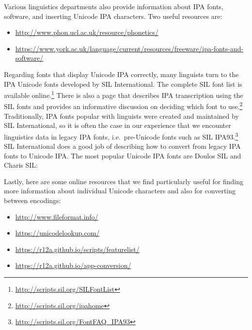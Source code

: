 \noindent Various linguistics departments also provide information about IPA fonts, software, and inserting Unicode IPA characters. Two useful resources are:

\begin{itemize}
	\item \url{http://www.phon.ucl.ac.uk/resource/phonetics/}
	\item \url{https://www.york.ac.uk/language/current/resources/freeware/ipa-fonts-and-software/}
\end{itemize}	

Regarding fonts that display Unicode IPA correctly, many linguists turn to the IPA Unicode fonts developed by SIL International. The complete SIL font list is available online.\footnote{\url{http://scripts.sil.org/SILFontList}} There is also a page that describes IPA transcription using the SIL fonts and provides an informative discussion on deciding which font to use.\footnote{\url{http://scripts.sil.org/ipahome}} Traditionally, IPA fonts popular with linguists were created and maintained by SIL International, so it is often the case in our experience that we encounter linguistics data in legacy IPA fonts, i.e.\ pre-Unicode fonts such as SIL IPA93.\footnote{\url{http://scripts.sil.org/FontFAQ_IPA93}} SIL International does a good job of describing how to convert from legacy IPA fonts to Unicode IPA. The most popular Unicode IPA fonts are Doulos SIL and Charis SIL:

\begin{itemize}
	\item \url{https://software.sil.org/doulos/}}
	\item \url{https://software.sil.org/charis/}
\end{itemize}	

Lastly, here are some online resources that we find particularly useful for finding more information about individual Unicode characters and also for converting between encodings:

\begin{itemize}
	\item \url{http://www.fileformat.info/}
	\item \url{https://unicodelookup.com/}
	\item \url{https://r12a.github.io/scripts/featurelist/}
	\item \url{https://r12a.github.io/app-conversion/}
\end{itemize}


